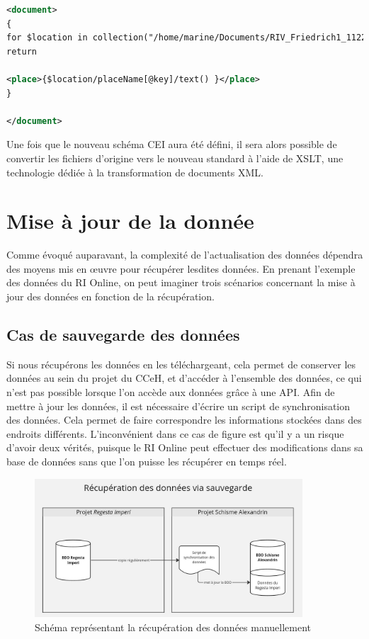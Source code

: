 \lstset{style=mystyle}
\begin{lstlisting}[language=XML]
<document>
{
for $location in collection("/home/marine/Documents/RIV_Friedrich1_1122-1190/")//issuePlace
return

<place>{$location/placeName[@key]/text() }</place>
}

</document>
\end{lstlisting}

Une fois que le nouveau schéma CEI aura été défini, il sera alors possible de convertir les fichiers d’origine vers le nouveau standard à l’aide de XSLT, une technologie dédiée à la transformation de documents XML. 


    \section{Mise à jour de la donnée}

Comme évoqué auparavant, la complexité de l’actualisation des données dépendra des moyens mis en œuvre pour récupérer lesdites données. En prenant l'exemple des données du RI Online, on peut imaginer trois scénarios concernant la mise à jour des données en fonction de la récupération. 

    \subsection{Cas de sauvegarde des données}

Si nous récupérons les données en les téléchargeant, cela permet de conserver les données au sein du projet du CCeH, et d'accéder à l'ensemble des données, ce qui n'est pas possible lorsque l'on accède aux données grâce à une API.
Afin de mettre à jour les données, il est nécessaire d'écrire un script de synchronisation des données. Cela permet de faire correspondre les informations stockées dans des endroits différents. L'inconvénient dans ce cas de figure est qu'il y a un risque d'avoir deux vérités, puisque le RI Online peut effectuer des modifications dans sa base de données sans que l'on puisse les récupérer en temps réel.\\ 

\begin{figure}[H]
    \centering
    \includegraphics[width=10cm]{images/recup-donnees-sauvegarde.jpg}
    \caption{Schéma représentant la récupération des données manuellement}
    \label{fig:schemadonneessauvegarde}
\end{figure}


